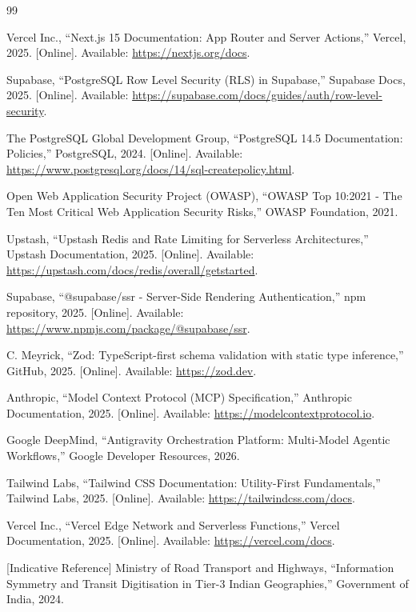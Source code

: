 \documentclass[12pt,a4paper]{report}
\begin{document}
\begin{thebibliography}{99}

Vercel Inc., ``Next.js 15 Documentation: App Router and Server Actions,'' Vercel, 2025. [Online]. Available: \url{https://nextjs.org/docs}. 

Supabase, ``PostgreSQL Row Level Security (RLS) in Supabase,'' Supabase Docs, 2025. [Online]. Available: \url{https://supabase.com/docs/guides/auth/row-level-security}.

The PostgreSQL Global Development Group, ``PostgreSQL 14.5 Documentation: Policies,'' PostgreSQL, 2024. [Online]. Available: \url{https://www.postgresql.org/docs/14/sql-createpolicy.html}.

Open Web Application Security Project (OWASP), ``OWASP Top 10:2021 - The Ten Most Critical Web Application Security Risks,'' OWASP Foundation, 2021.

Upstash, ``Upstash Redis and Rate Limiting for Serverless Architectures,'' Upstash Documentation, 2025. [Online]. Available: \url{https://upstash.com/docs/redis/overall/getstarted}.

Supabase, ``@supabase/ssr - Server-Side Rendering Authentication,'' npm repository, 2025. [Online]. Available: \url{https://www.npmjs.com/package/@supabase/ssr}.

C. Meyrick, ``Zod: TypeScript-first schema validation with static type inference,'' GitHub, 2025. [Online]. Available: \url{https://zod.dev}.

Anthropic, ``Model Context Protocol (MCP) Specification,'' Anthropic Documentation, 2025. [Online]. Available: \url{https://modelcontextprotocol.io}.

Google DeepMind, ``Antigravity Orchestration Platform: Multi-Model Agentic Workflows,'' Google Developer Resources, 2026.

Tailwind Labs, ``Tailwind CSS Documentation: Utility-First Fundamentals,'' Tailwind Labs, 2025. [Online]. Available: \url{https://tailwindcss.com/docs}.

Vercel Inc., ``Vercel Edge Network and Serverless Functions,'' Vercel Documentation, 2025. [Online]. Available: \url{https://vercel.com/docs}.

[Indicative Reference] Ministry of Road Transport and Highways, ``Information Symmetry and Transit Digitisation in Tier-3 Indian Geographies,'' Government of India, 2024.


\end{thebibliography}
\end{document}
